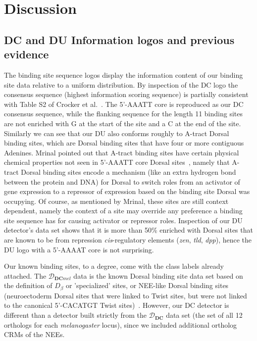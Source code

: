 \section{Discussion}

\subsection{DC and DU Information logos and previous evidence}
The binding site sequence logos display the information content of our binding site data relative to a uniform distribution.  By inspection of the DC logo the consensus sequence (highest information scoring sequence) is partially consistent with Table S2 of Crocker et al.~\cite{pmid20981027}.  The 5'-AAATT core is reproduced as our DC consensus sequence, while the flanking sequence for the length 11 binding sites are not enriched with G at the start of the site and a C at the end of the site.  Similarly we can see that our DU also conforms roughly to A-tract Dorsal binding sites, which are Dorsal binding sites that have four or more contiguous Adenines.  Mrinal pointed out that A-tract binding sites have certain physical chemical properties not seen in 5'-AAATT core Dorsal sites~\cite{pmid21890896}, namely that A-tract Dorsal binding sites encode a mechanism (like an extra hydrogen bond between the protein and DNA) for Dorsal to switch roles from an activator of gene expression to a repressor of expression based on the binding site Dorsal was occupying.  Of course, as mentioned by Mrinal, these sites are still context dependent, namely the context of a site may override any preference a binding site sequence has for causing activator or repressor roles\cite{pmid1582412}.  Inspection of our DU detector's data set shows that it is more than 50\% enriched with Dorsal sites that are known to be from repression \textit{cis}-regulatory elements (\textit{zen}, \textit{tld}, \textit{dpp}), hence the DU logo with a 5'-AAAAT core is not surprising.

Our known binding sites, to a degree, come with the class labels already attached.  The $\mathcal D_{\textbf{DC}\textit{mel}}$ data is the known Dorsal binding site data set based on the definition of $\textit{D}_{\beta}$ or 'specialized' sites, or NEE-like Dorsal binding sites (neuroectoderm Dorsal sites that were linked to Twist sites, but were not linked to the canonical 5'-CACATGT Twist sites)~\cite{pmid20981027,pmid15026577}.
However, our DC detector is different than a detector built strictly from the $\mathcal D_{\textbf{DC}}$ data set (the set of all 12 orthologs for each {\em melanogaster} locus), since we included additional ortholog CRMs of the NEEs.  
 
